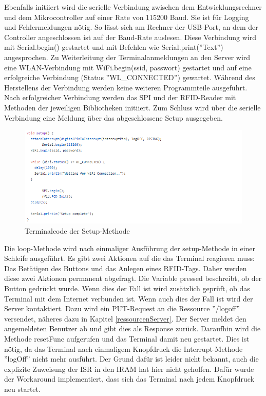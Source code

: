 \documentclass[12pt,titlepage]{scrartcl}
\begin{document}
		Ebenfalls initiiert wird die serielle Verbindung zwischen dem Entwicklungsrechner und dem Mikrocontroller auf einer Rate von 115200 Baud. Sie ist für Logging und Fehlermeldungen nötig. So lässt sich am Rechner der USB-Port, an dem der Controller angeschlossen ist auf der Baud-Rate auslesen. Diese Verbindung wird mit Serial.begin() gestartet und mit Befehlen wie Serial.print(''Text'') angesprochen. Zu Weiterleitung der Terminalanmeldungen an den Server wird eine WLAN-Verbindung mit WiFi.begin(ssid, passwort) gestartet und auf eine erfolgreiche Verbindung (Status ''WL\_CONNECTED'') gewartet. Während des Herstellens der Verbindung werden keine weiteren Programmteile ausgeführt. Nach erfolgreicher Verbindung werden das SPI und der RFID-Reader mit Methoden der jeweiligen Bibliotheken initiiert. Zum Schluss wird über die serielle Verbindung eine Meldung über das abgeschlossene Setup ausgegeben. \\
			\begin{figure}[H] 
  			\centering
    		\includegraphics[height=0.3\textheight]{terminalSetup}
  			\caption{Terminalcode der Setup-Methode}
  			\label{fig:terminalSetup}
		\end{figure}
		\noindent Die loop-Methode wird nach einmaliger Ausführung der setup-Methode in einer Schleife ausgeführt. Es gibt zwei Aktionen auf die das Terminal reagieren muss: Das Betätigen des Buttons und das Anlegen eines RFID-Tags. Daher werden diese zwei Aktionen permanent abgefragt. Die Variable pressed beschreibt, ob der Button gedrückt wurde. Wenn dies der Fall ist wird zusätzlich geprüft, ob das Terminal mit dem Internet verbunden ist. Wenn auch dies der Fall ist wird der Server kontaktiert. Dazu wird ein PUT-Request an die Ressource ''/logoff'' versendet, näheres dazu in Kapitel \ref{ressourcenServer}. Der Server meldet den angemeldeten Benutzer ab und gibt dies als Response zurück. Daraufhin wird die Methode resetFunc aufgerufen und das Terminal damit neu gestartet. Dies ist nötig, da das Terminal nach einmaligem Knopfdruck die Interrupt-Methode ''logOff'' nicht mehr ausführt. Der Grund dafür ist leider nicht bekannt, auch die explizite Zuweisung der ISR in den IRAM hat hier nicht geholfen. Dafür wurde der Workaround implementiert, dass sich das Terminal nach jedem Knopfdruck neu startet. \\ \\
\end{document}
